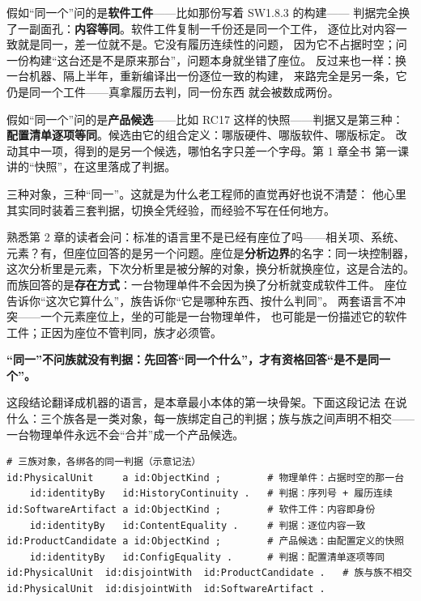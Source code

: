 假如“同一个”问的是\textbf{软件工件}——比如那份写着 SW1.8.3 的构建——
判据完全换了一副面孔：\textbf{内容等同}。软件工件复制一千份还是同一个工件，
逐位比对内容一致就是同一，差一位就不是。它没有履历连续性的问题，
因为它不占据时空；问一份构建“这台还是不是原来那台”，问题本身就坐错了座位。
反过来也一样：换一台机器、隔上半年，重新编译出一份逐位一致的构建，
来路完全是另一条，它仍是同一个工件——真拿履历去判，同一份东西
就会被数成两份。

假如“同一个”问的是\textbf{产品候选}——比如 RC17 这样的快照——判据又是第三种：
\textbf{配置清单逐项等同}。候选由它的组合定义：哪版硬件、哪版软件、哪版标定。
改动其中一项，得到的是另一个候选，哪怕名字只差一个字母。第 1 章全书
第一课讲的“快照”，在这里落成了判据。

三种对象，三种“同一”。这就是为什么老工程师的直觉再好也说不清楚：
他心里其实同时装着三套判据，切换全凭经验，而经验不写在任何地方。

熟悉第 2 章的读者会问：标准的语言里不是已经有座位了吗——相关项、系统、
元素？有，但座位回答的是另一个问题。座位是\textbf{分析边界}的名字：同一块控制器，
这次分析里是元素，下次分析里是被分解的对象，换分析就换座位，这是合法的。
而族回答的是\textbf{存在方式}：一台物理单件不会因为换了分析就变成软件工件。
座位告诉你“这次它算什么”，族告诉你“它是哪种东西、按什么判同”。
两套语言不冲突——一个元素座位上，坐的可能是一台物理单件，
也可能是一份描述它的软件工件；正因为座位不管判同，族才必须管。

\textbf{“同一”不问族就没有判据：先回答“同一个什么”，才有资格回答“是不是同一个”。}

这段结论翻译成机器的语言，是本章最小本体的第一块骨架。下面这段记法
在说什么：三个族各是一类对象，每一族绑定自己的判据；族与族之间声明不相交——
一台物理单件永远不会“合并”成一个产品候选。

\nopagebreak[4]
\begin{codebox}
\begin{Verbatim}[fontsize=\small,breaklines=true,breakanywhere=true,breaksymbolleft={},breaksymbolright={}]
# 三族对象，各绑各的同一判据（示意记法）
id:PhysicalUnit     a id:ObjectKind ;        # 物理单件：占据时空的那一台
    id:identityBy   id:HistoryContinuity .   # 判据：序列号 + 履历连续
id:SoftwareArtifact a id:ObjectKind ;        # 软件工件：内容即身份
    id:identityBy   id:ContentEquality .     # 判据：逐位内容一致
id:ProductCandidate a id:ObjectKind ;        # 产品候选：由配置定义的快照
    id:identityBy   id:ConfigEquality .      # 判据：配置清单逐项等同
id:PhysicalUnit  id:disjointWith  id:ProductCandidate .   # 族与族不相交
id:PhysicalUnit  id:disjointWith  id:SoftwareArtifact .
\end{Verbatim}
\end{codebox}

